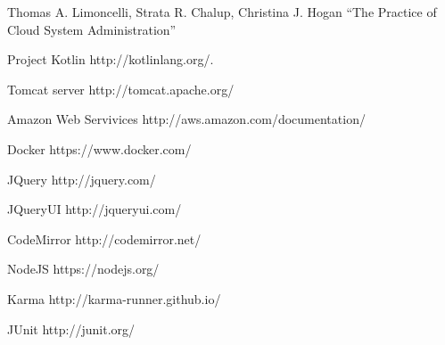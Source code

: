 \begin{thebibliography}{99}
    
	Thomas A. Limoncelli, Strata R. Chalup, Christina J. Hogan
    ``The Practice of Cloud
System Administration''

    Project Kotlin http://kotlinlang.org/.
    
    Tomcat server http://tomcat.apache.org/
    
    Amazon Web Servivices  http://aws.amazon.com/documentation/
    
    Docker https://www.docker.com/
    
    
    
    JQuery http://jquery.com/
    
    JQueryUI http://jqueryui.com/
    
    CodeMirror http://codemirror.net/
    
    NodeJS https://nodejs.org/
    
    Karma http://karma-runner.github.io/
    
    JUnit http://junit.org/


\end{thebibliography}
